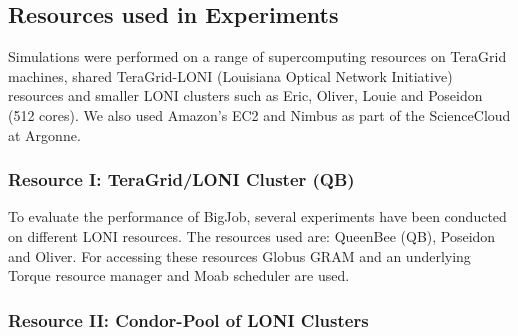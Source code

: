 \documentclass[conference,final]{IEEEtran}
\newcommand{\up}{\vspace*{-1em}}
\newcommand{\jhanote}[1]{ {\textcolor{red} { ***SJ: #1 }}}
\newcommand{\jhanote}[1]{}
\begin{document}


\subsection{Resources used in Experiments}
\up 

Simulations were performed on a range of supercomputing resources on
TeraGrid machines, shared TeraGrid-LONI (Louisiana Optical Network
Initiative)~\cite{LONI_web} resources and smaller LONI clusters such
as Eric, Oliver, Louie and Poseidon (512 cores).  We also used
Amazon's EC2 and Nimbus as part of the ScienceCloud at Argonne.

\subsubsection*{Resource I: TeraGrid/LONI Cluster (QB)}

To evaluate the performance of BigJob, several experiments have been
conducted on different LONI resources. The resources used are:
QueenBee (QB), Poseidon and Oliver. For accessing these resources
Globus GRAM and an underlying Torque resource manager and Moab
scheduler are used.

\subsubsection*{Resource II: Condor-Pool of LONI Clusters}

\end{document}
